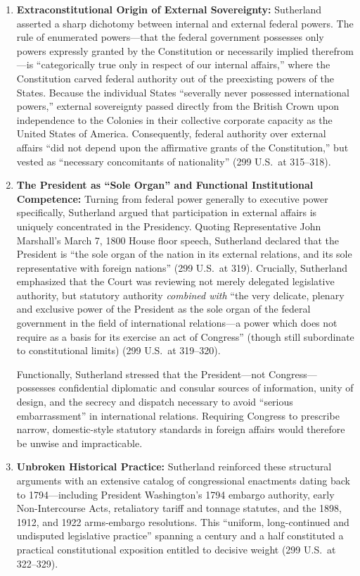 \documentclass[12pt]{article}
\begin{document}
\begin{enumerate}
  \item \textbf{Extraconstitutional Origin of External Sovereignty:} Sutherland asserted a sharp dichotomy between internal and external federal powers. The rule of enumerated powers---that the federal government possesses only powers expressly granted by the Constitution or necessarily implied therefrom---is ``categorically true only in respect of our internal affairs,'' where the Constitution carved federal authority out of the preexisting powers of the States. Because the individual States ``severally never possessed international powers,'' external sovereignty passed directly from the British Crown upon independence to the Colonies in their collective corporate capacity as the United States of America. Consequently, federal authority over external affairs ``did not depend upon the affirmative grants of the Constitution,'' but vested as ``necessary concomitants of nationality'' (299 U.S.\ at 315--318).

  \item \textbf{The President as ``Sole Organ'' and Functional Institutional Competence:} Turning from federal power generally to executive power specifically, Sutherland argued that participation in external affairs is uniquely concentrated in the Presidency. Quoting Representative John Marshall's March 7, 1800 House floor speech, Sutherland declared that the President is ``the sole organ of the nation in its external relations, and its sole representative with foreign nations'' (299 U.S.\ at 319). Crucially, Sutherland emphasized that the Court was reviewing not merely delegated legislative authority, but statutory authority \textit{combined with} ``the very delicate, plenary and exclusive power of the President as the sole organ of the federal government in the field of international relations---a power which does not require as a basis for its exercise an act of Congress'' (though still subordinate to constitutional limits) (299 U.S.\ at 319--320).

  Functionally, Sutherland stressed that the President---not Congress---possesses confidential diplomatic and consular sources of information, unity of design, and the secrecy and dispatch necessary to avoid ``serious embarrassment'' in international relations. Requiring Congress to prescribe narrow, domestic-style statutory standards in foreign affairs would therefore be unwise and impracticable.

  \item \textbf{Unbroken Historical Practice:} Sutherland reinforced these structural arguments with an extensive catalog of congressional enactments dating back to 1794---including President Washington's 1794 embargo authority, early Non-Intercourse Acts, retaliatory tariff and tonnage statutes, and the 1898, 1912, and 1922 arms-embargo resolutions. This ``uniform, long-continued and undisputed legislative practice'' spanning a century and a half constituted a practical constitutional exposition entitled to decisive weight (299 U.S.\ at 322--329).


\end{enumerate}
\end{document}
